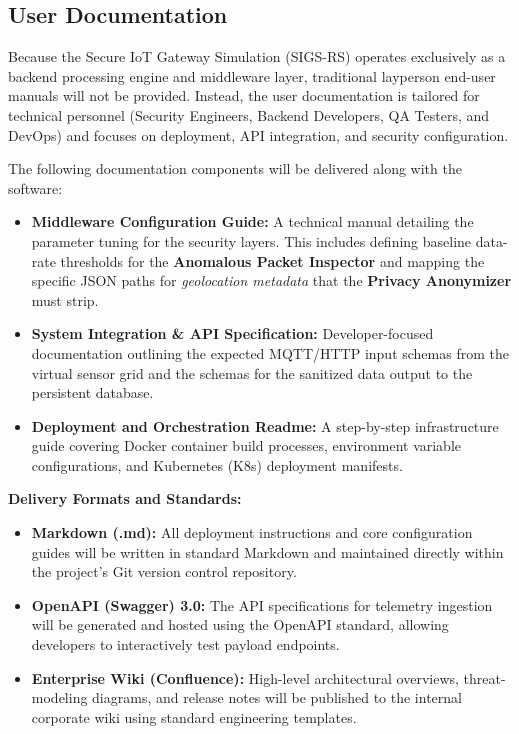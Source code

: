 \documentclass[12pt,letterpaper]{article}
\begin{document}
\subsection{User Documentation}
Because the Secure IoT Gateway Simulation (SIGS-RS) operates exclusively as a backend processing engine and middleware layer, traditional layperson end-user manuals will not be provided. Instead, the user documentation is tailored for technical personnel (Security Engineers, Backend Developers, QA Testers, and DevOps) and focuses on deployment, API integration, and security configuration.

The following documentation components will be delivered along with the software:

\begin{itemize}
\item \textbf{Middleware Configuration Guide:} A technical manual detailing the parameter tuning for the security layers. This includes defining baseline data-rate thresholds for the \textbf{Anomalous Packet Inspector} and mapping the specific JSON paths for \emph{geolocation metadata} that the \textbf{Privacy Anonymizer} must strip.
\item \textbf{System Integration \& API Specification:} Developer-focused documentation outlining the expected MQTT/HTTP input schemas from the virtual sensor grid and the schemas for the sanitized data output to the persistent database.
\item \textbf{Deployment and Orchestration Readme:} A step-by-step infrastructure guide covering Docker container build processes, environment variable configurations, and Kubernetes (K8s) deployment manifests.
\end{itemize}

\textbf{Delivery Formats and Standards:}
\begin{itemize}
\item \textbf{Markdown (.md):} All deployment instructions and core configuration guides will be written in standard Markdown and maintained directly within the project's Git version control repository.
\item \textbf{OpenAPI (Swagger) 3.0:} The API specifications for telemetry ingestion will be generated and hosted using the OpenAPI standard, allowing developers to interactively test payload endpoints.
\item \textbf{Enterprise Wiki (Confluence):} High-level architectural overviews, threat-modeling diagrams, and release notes will be published to the internal corporate wiki using standard engineering templates.
\end{itemize}
\end{document}

